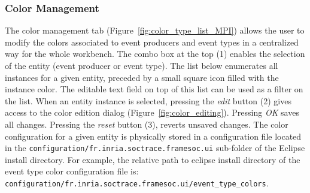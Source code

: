 \documentclass[twoside]{article}
\begin{document}
\begin{sloppypar}
\subsubsection{Color Management}
\label{subsec:colors}

The color management tab (Figure~\ref{fig:color_type_list_MPI}) allows the user to modify the colors associated to event producers and event types in a centralized way for the whole workbench.
The combo box at the top (\num{1}) enables the selection of the entity (event producer or event type).
The list below enumerates all instances for a given entity, preceded by a small square icon filled with the instance color.
The editable text field on top of this list can be used as a filter on the list.
When an entity instance is selected, pressing the \emph{edit} button (\num{2}) gives access to the color edition dialog (Figure~\ref{fig:color_editing}).
Pressing \emph{OK} saves all changes.
Pressing the \emph{reset} button (\num{3}), reverts unsaved changes.
The color configuration for a given entity is physically stored in a configuration file located in the \texttt{configuration/fr.inria.soctrace.framesoc.ui} sub-folder of the Eclipse install directory.
For example, the relative path to eclipse install directory of the event type color configuration file is:
\texttt{configuration/fr.inria.soctrace.framesoc.ui/event\_type\_colors}.


\end{sloppypar}
\end{document}
